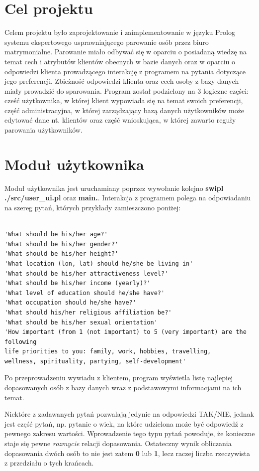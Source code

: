 \documentclass[12pt]{article}
\begin{document}
	\section{Cel projektu}
	Celem projektu było zaprojektowanie i zaimplementowanie w języku Prolog systemu ekspertowego usprawniającego parowanie osób przez biuro matrymonialne. Parowanie miało odbywać się w oparciu o posiadaną wiedzę na temat cech i atrybutów klientów obecnych w bazie danych oraz w oparciu o odpowiedzi klienta prowadzącego interakcję z programem na pytania dotyczące jego preferencji. Zbieżność odpowiedzi klienta oraz cech osoby z bazy danych miały prowadzić do sparowania. Program został podzielony na 3 logiczne części: cześć użytkownika, w której klient wypowiada się na temat swoich preferencji, część administracyjna, w której zarządzający bazą danych użytkowników może edytować dane nt. klientów oraz część wnioskująca, w której zawarto reguły parowania użytkowników.
	\section{Moduł użytkownika}
Moduł użytkownika jest uruchamiany poprzez wywołanie kolejno \textbf{swipl ./src/user\_ui.pl} oraz \textbf{main.}.
Interakcja z programem polega na odpowiadaniu na szereg pytań, których przykłady zamieszczono poniżej:
	\begin{verbatim}
	
'What should be his/her age?'
'What should be his/her gender?'
'What should be his/her height?'
'What location (lon, lat) should he/she be living in'
'What should be his/her attractiveness level?'
'What should be his/her income (yearly)?'
'What level of education should he/she have?'
'What occupation should he/she have?'
'What should his/her religious affiliation be?'
'What should be his/her sexual orientation'
'How important (from 1 (not important) to 5 (very important) are the following 
life priorities to you: family, work, hobbies, travelling,
wellness, spirituality, partying, self-development'
	\end{verbatim}

Po przeprowadzeniu wywiadu z klientem, program wyświetla listę najlepiej dopasowanych osób z bazy danych wraz z podstawowymi informacjami na ich temat.
	
Niektóre z zadawanych pytań pozwalają jedynie na odpowiedzi TAK/NIE, jednak jest część pytań, np. pytanie o wiek, na które udzielona może być odpowiedź z pewnego zakresu wartości. Wprowadzenie tego typu pytań powoduje, że konieczne staje się pewne \textit{rozmycie} relacji dopasowania. Ostateczny wynik obliczania dopasowania dwóch osób to nie jest zatem \textbf{0} lub \textbf{1}, lecz raczej liczba rzeczywista z przedziału o tych krańcach.
\newpage
\end{document}

